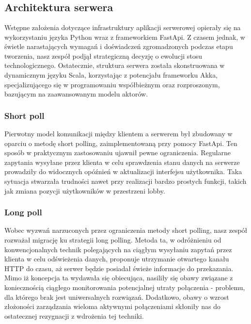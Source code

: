 \chapter{\ChapterTitleRealizationAspects}
\label{sec:wybrane-aspekty-realizacji}

\section{Architektura serwera}
Wstępne założenia dotyczące infrastruktury aplikacji serwerowej opierały się na wykorzystaniu języka Python wraz z frameworkiem FastApi. Z czasem jednak, w świetle narastających wymagań i doświadczeń zgromadzonych podczas etapu tworzenia, nasz zespół podjął strategiczną decyzję o ewolucji stosu technologicznego. Ostatecznie, struktura serwera została skonstruowana w dynamicznym języku Scala, korzystając z potencjału frameworku Akka, specjalizującego się w programowaniu współbieżnym oraz rozproszonym, bazującym na zaawansowanym modelu aktorów. 
\subsection{Short poll}
Pierwotny model komunikacji między klientem a serwerem był zbudowany w oparciu o metodę short polling, zaimplementowaną przy pomocy FastApi. Ten sposób w praktycznym zastosowaniu ujawnił pewne ograniczenia. Regularne zapytania wysyłane przez klienta w celu sprawdzenia stanu danych na serwerze prowadziły do widocznych opóźnień w aktualizacji interfejsu użytkownika. Taka sytuacja stwarzała trudności nawet przy realizacji bardzo prostych funkcji, takich jak zmiana pozycji użytkowników w przestrzeni lobby.
\subsection{Long poll}
Wobec wyzwań narzuconych przez ograniczenia metody short polling, nasz zespół rozważał migrację ku strategii long polling. Metoda ta, w odróżnieniu od konwencjonalnych technik polegających na ciągłym wysyłaniu zapytań przez klienta w celu odświeżenia danych, proponuje utrzymanie otwartego kanału HTTP do czasu, aż serwer będzie posiadał świeże informacje do przekazania. Mimo iż koncepcja ta wydawała się obiecująca, nasiliły się obawy związane z koniecznością ciągłego monitorowania potencjalnej utraty połączenia - problemu, dla którego brak jest uniwersalnych rozwiązań. Dodatkowo, obawy o wzrost złożoności zarządzania wieloma aktywnymi połączeniami skłoniły nas do ostatecznej rezygnacji z wdrożenia tej techniki.

